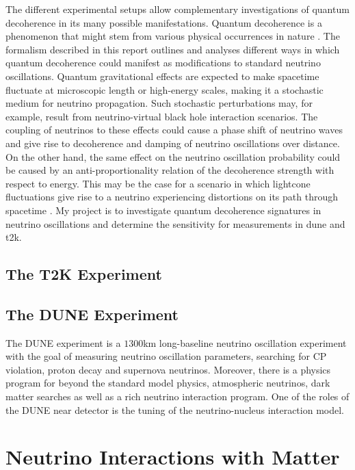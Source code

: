 The different experimental setups allow complementary investigations of quantum decoherence in its many possible manifestations. Quantum decoherence is a phenomenon that might stem from various physical occurrences in nature \cite{Farzan:2008zv}. The formalism described in this report outlines and analyses different ways in which quantum decoherence could manifest as modifications to standard neutrino oscillations. Quantum gravitational effects are expected to make spacetime fluctuate at microscopic length or high-energy scales, making it a stochastic medium for neutrino propagation. Such stochastic perturbations may, for example, result from neutrino-virtual black hole interaction scenarios. The coupling of neutrinos to these effects could cause a phase shift of neutrino waves and give rise to decoherence and damping of neutrino oscillations over distance. On the other hand, the same effect on the neutrino oscillation probability could be caused by an anti-proportionality relation of the decoherence strength with respect to energy. This may be the case for a scenario in which lightcone fluctuations give rise to a neutrino experiencing distortions on its path through spacetime \cite{Stuttard:2021uyw}. My project is to investigate  quantum decoherence signatures in neutrino oscillations and determine the sensitivity for measurements in \acrshort{dune} and \acrshort{t2k}.

\subsection{The T2K Experiment}

\subsection{The DUNE Experiment}
The DUNE experiment is a $1300$km long-baseline neutrino oscillation experiment with the goal of measuring neutrino oscillation parameters, searching for CP violation, proton decay and supernova neutrinos. Moreover, there is a physics program for beyond the standard model physics, atmospheric neutrinos, dark matter searches as well as a rich neutrino interaction program. One of the roles of the DUNE near detector is the tuning of the neutrino-nucleus interaction model.

\section{Neutrino Interactions with Matter}

